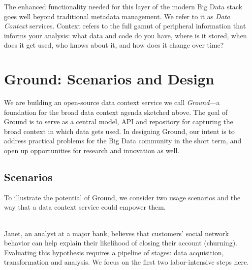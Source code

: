 \documentclass{sig-alternate}
\begin{document}
The enhanced functionality needed for this layer of the modern Big Data stack goes well beyond traditional metadata management. We refer to it as \emph{Data Context} services. Context refers to the full gamut of peripheral information that informs your analysis: what data and code do you have, where is it stored, when does it get used, who knows about it, and how does it change over time?  

\section{Ground: Scenarios and Design}
We are building an open-source data context service we call \emph{Ground}---a foundation for the broad data context agenda sketched above. 
The goal of Ground is to serve as a central model, API and repository for capturing the broad context in which data gets used. In designing Ground, our intent is to address practical problems for the Big Data community in the short term, and open up opportunities for research and innovation as well.

\subsection{Scenarios}
\label{sec:scenarios}
To illustrate the potential of Ground, we consider two usage scenarios and the way that a data context service could empower them.


\\
Janet, an analyst at a major bank, believes that customers' social network behavior can help explain their likelihood of closing their account (churning). Evaluating this hypothesis requires a pipeline of stages: data acquisition, transformation and analysis.
We focus on the first two labor-intensive steps here.
\end{document}
